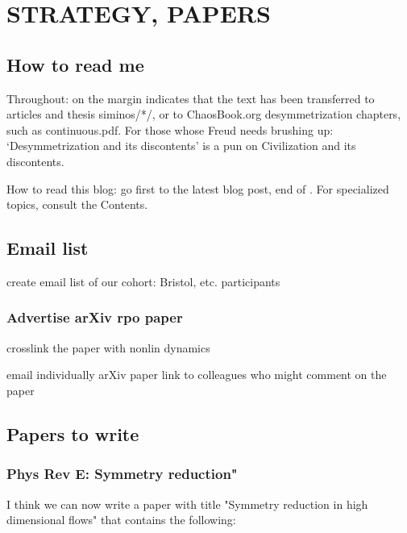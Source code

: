 
\chapter{STRATEGY, PAPERS}

\section{How to read me}

Throughout:  {\textdollar} on the margin
{\steady}
indicates that the text has been transferred to
articles and thesis siminos/*/,  or to ChaosBook.org desymmetrization
chapters, such as
{continuous.pdf}.
%
For those whose Freud needs brushing up:
`Desymmetrization and its discontents' is a pun
on 
{Civilization and its discontents}.

How to read this blog: go first to the latest blog post, end
of . For specialized topics, consult the
Contents.


\section{Email list}

create email list of our cohort:  Bristol, etc. participants

\subsection{Advertise arXiv rpo paper}

crosslink the paper with nonlin dynamics

email individually arXiv paper link to colleagues who might comment
    on the paper



\section{Papers to write}

\subsection{Phys Rev E: Symmetry reduction"}

\medskip{}
I think we can now write a paper with title "Symmetry
reduction in high dimensional flows" that contains the
following:

